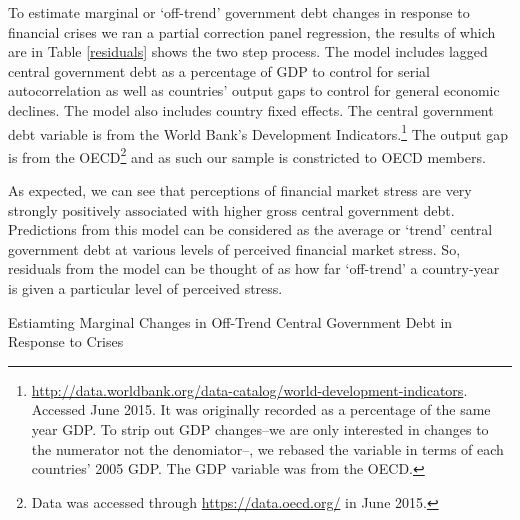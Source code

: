 \documentclass[]{article}
\begin{document}
To estimate marginal or `off-trend' government debt changes in response to financial crises we ran a partial correction panel regression, the results of which are in Table \ref{residuals} shows the two step process. The model includes lagged central government debt as a percentage of GDP to control for serial autocorrelation as well as countries' output gaps to control for general economic declines. The model also includes country fixed effects. The central government debt variable is from the World Bank's Development Indicators.\footnote{\url{http://data.worldbank.org/data-catalog/world-development-indicators}. Accessed June 2015. It was originally recorded as a percentage of the same year GDP. To strip out GDP changes--we are only interested in changes to the numerator not the denomiator--, we rebased the variable in terms of each countries' 2005 GDP. The GDP variable was from the OECD.} The output gap is from the OECD\footnote{Data was accessed through \url{https://data.oecd.org/} in June 2015.} and as such our sample is constricted to OECD members.

As expected, we can see that perceptions of financial market stress are very strongly positively associated with higher gross central government debt. Predictions from this model can be considered as the average or `trend' central government debt at various levels of perceived financial market stress. So, residuals from the model can be thought of as how far `off-trend' a country-year is given a particular level of perceived stress.

\begin{table}
    \caption{Estiamting Marginal Changes in Off-Trend Central Government Debt in Response to Crises}
    \label{results_elect}
    \begin{center}
        
    \end{center}
\end{table}
\end{document}
